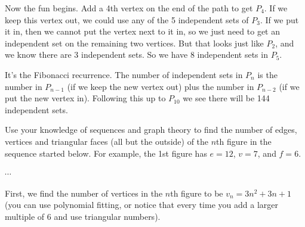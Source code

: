 \begin{questions}
\begin{solution}
Now the fun begins.  Add a 4th vertex on the end of the path to get $P_4$.  If we keep this vertex out, we could use any of the 5 independent sets of $P_3$.  If we put it in, then we cannot put the vertex next to it in, so we just need to get an independent set on the remaining two vertices.  But that looks just like $P_2$, and we know there are 3 independent sets.  So we have $8$ independent sets in $P_5$.

It's the Fibonacci recurrence.  The number of independent sets in $P_n$ is the number in $P_{n-1}$ (if we keep the new vertex out) plus the number in $P_{n-2}$ (if we put the new vertex in).  Following this up to $P_{10}$ we see there will be 144 independent sets.
\end{solution}



\question[5] Use your knowledge of sequences and graph theory to find the number of edges, vertices and triangular faces (all but the outside) of the $n$th figure in the sequence started below.  For example, the 1st figure has $e = 12$, $v = 7$, and $f = 6$.

\hfill
{}
\hfill
{}
\hfill
$\cdots$

\begin{solution}
  First, we find the number of vertices in the $n$th figure to be $v_n = 3n^2 +3n + 1$ (you can use polynomial fitting, or notice that every time you add a larger multiple of 6 and use triangular numbers).


\end{solution}
\end{questions}
